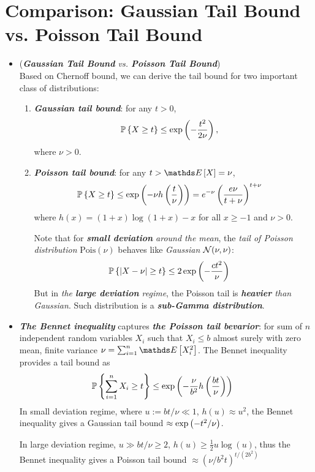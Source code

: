\documentclass[11pt]{article}
\begin{document}
\section{Comparison: Gaussian Tail Bound vs. Poisson Tail Bound}
\begin{itemize}
\item \begin{remark} (\emph{\textbf{Gaussian Tail Bound} vs. \textbf{Poisson Tail Bound}})\\
Based on Chernoff bound, we can derive the tail bound for two important class of distributions: 
\begin{enumerate}
\item \emph{\textbf{Gaussian tail bound}}: for any $t > 0$, 
\begin{align*}
{\mathbb P}\left\{X \ge t\right\} &\le \exp\left(-\frac{t^2}{2 \nu}\right),
\end{align*} where $\nu >0$.
\item \emph{\textbf{Poisson tail bound}}:  for any $t > \E{}{X} = \nu$,
\begin{align*}
{\mathbb P}\left\{X \ge t\right\} &\le \exp\left(-  \nu h\left(\frac{t}{\nu}\right)\right) = e^{-\nu}\left(\frac{e \nu}{t + \nu}\right)^{t+\nu}
\end{align*} where $h(x) = (1 + x) \log(1 + x) - x$ for all  $x \ge -1$ and $\nu >0$.

Note that for \emph{\textbf{small deviation} around the mean}, the \emph{tail of Poisson distribution} $\text{Pois}(\nu)$ behaves like \emph{Gaussian} ${\mathcal N}(\nu, \nu)$:
\begin{align*}
{\mathbb P}\left\{\left\lvert X - \nu \right\rvert \ge t\right\}& \le 2\exp\left(- \frac{c t^2}{\nu}\right)
\end{align*}
But in \emph{the \textbf{large deviation} regime}, the Poisson tail is \emph{\textbf{heavier} than Gaussian}. Such distribution is a \emph{\textbf{sub-Gamma distribution}}. 
\end{enumerate}
\end{remark}

\item \begin{remark}
\emph{\textbf{The Bennet inequality}} captures \emph{\textbf{the Poisson tail bevarior}}:  for sum of  $n$ independent random variables $X_i$ such that $X_i \le b$ almost surely with zero mean, finite variance $\nu = \sum_{i=1}^n \E{}{X_i^2}$.  The Bennet inequality provides a tail bound as
\begin{align*}
{\mathbb P}\left\{\sum_{i=1}^n X_i \ge t\right\} &\le \exp\left(-  \frac{\nu}{b^2} h\left(\frac{b t}{\nu}\right)\right)
\end{align*} In small deviation regime, where $u:= bt/\nu \ll 1$, $h(u) \approx u^2$, the Bennet inequality gives a Gaussian tail bound $\approx \exp\left(- t^2/\nu\right)$.

In large deviation regime, $u \gg bt/\nu \ge 2$, $h(u) \ge \frac{1}{2}u \log(u)$, thus the Bennet inequality gives a Poisson tail bound $\approx (\nu/b^2t)^{t /(2 b^2)}$
\end{remark}
\end{itemize}
\end{document}
